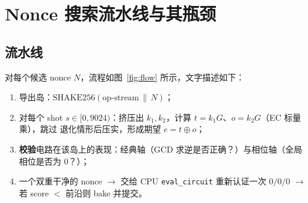 \documentclass[11pt]{ctexart}
\let\c\lstinline
\begin{document}
\section{Nonce 搜索流水线与其瓶颈}

\subsection{流水线}
对每个候选 nonce $N$，流程如图~\ref{fig:flow} 所示，文字描述如下：
\begin{enumerate}[nosep]
  \item 导出岛：$\text{SHAKE256}(\text{op-stream}\,\|\,N)$；
  \item 对每个 shot $s\in[0,9024)$：挤压出 $k_1,k_2$，计算 $t=k_1G$、$o=k_2G$（EC 标量乘），跳过
  退化情形后压实，形成期望 $e=t\oplus o$；
  \item \textbf{校验}电路在该岛上的表现：经典轴（GCD 求逆是否正确？）与相位轴（全局相位是否为
  $0$？）；
  \item 一个双重干净的 nonce $\to$ 交给 CPU \c{eval_circuit} 重新认证一次 $0/0/0$ $\to$ 若
  score $<$ 前沿则 bake 并提交。
\end{enumerate}
\end{document}
